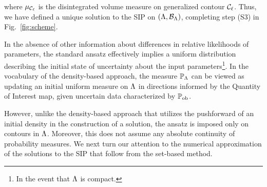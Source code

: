 \noindent where $\mu_{\mathcal{C}_\ell}$ is the disintegrated volume measure on generalized contour $\mathcal{C}_\ell$.
Thus, we have defined a unique solution to the SIP on ${({\Lambda}, \mathcal{B}_{{\Lambda}})}$, completing step (S3) in Fig.~\ref{fig:scheme}.

In the absence of other information about differences in relative likelihoods of parameters, the standard ansatz effectively implies a uniform distribution describing the initial state of uncertainty about the input parameters\footnote{In the event that ${\Lambda}$ is compact.}.
In the vocabulary of the density-based approach, the measure $\mathbb{P}_{\Lambda}$ can be viewed as updating an initial uniform measure on ${\Lambda}$ in directions informed by the Quantity of Interest map, given uncertain data characterized by $\operatorname*{\mathbb{P}_{ob}}$.

However, unlike the density-based approach that utilizes the pushforward of an initial density in the construction of a solution, the ansatz is imposed only on contours in ${\Lambda}$.
Moreover, this does not assume any absolute continuity of probability measures.
We next turn our attention to the numerical approximation of the solutions to the SIP that follow from the set-based method.

\FloatBarrier
